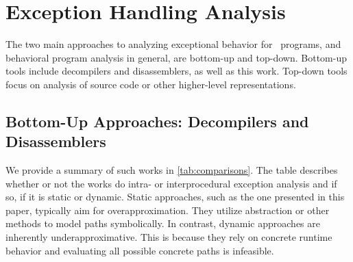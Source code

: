 \section{Exception Handling Analysis}

The two main approaches to analyzing exceptional behavior for \Cpp\ programs, and behavioral program analysis in general, are bottom-up and top-down.
Bottom-up tools include decompilers and disassemblers, as well as this work.
Top-down tools focus on analysis of source code or other higher-level representations.

\subsection{Bottom-Up Approaches: Decompilers and Disassemblers}
We provide a summary of such works in \cref{tab:comparisons}.
The table describes whether or not the works do intra- or interprocedural exception analysis and if so, if it is static or dynamic.
Static approaches, such as the one presented in this paper, typically aim for overapproximation.
They utilize abstraction or other methods to model paths symbolically.
In contrast, dynamic approaches are inherently underapproximative.
This is because they rely on concrete runtime behavior and evaluating all possible concrete paths is infeasible.
